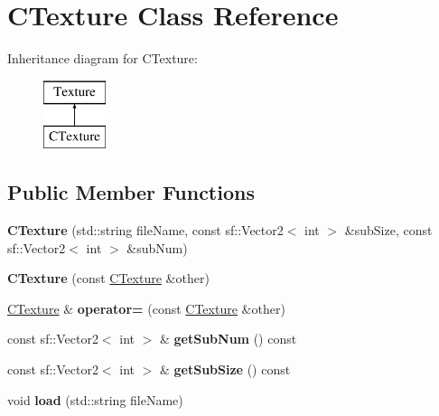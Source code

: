 \hypertarget{classCTexture}{\section{C\-Texture Class Reference}
\label{classCTexture}
}
Inheritance diagram for C\-Texture\-:\begin{figure}[H]
\begin{center}
\leavevmode
\includegraphics[height=2.000000cm]{classCTexture}
\end{center}
\end{figure}
\subsection*{Public Member Functions}
\begin{DoxyCompactItemize}
\item 
\hypertarget{classCTexture_a03a03314b328783682d200443b561890}{{\bfseries C\-Texture} (std\-::string file\-Name, const sf\-::\-Vector2$<$ int $>$ \&sub\-Size, const sf\-::\-Vector2$<$ int $>$ \&sub\-Num)}\label{classCTexture_a03a03314b328783682d200443b561890}

\item 
\hypertarget{classCTexture_a2bb6709e0d63ccb6fb3219eb5528570f}{{\bfseries C\-Texture} (const \hyperlink{classCTexture}{C\-Texture} \&other)}\label{classCTexture_a2bb6709e0d63ccb6fb3219eb5528570f}

\item 
\hypertarget{classCTexture_ab4f29f7f73e347dfac33672e3b9a64c8}{\hyperlink{classCTexture}{C\-Texture} \& {\bfseries operator=} (const \hyperlink{classCTexture}{C\-Texture} \&other)}\label{classCTexture_ab4f29f7f73e347dfac33672e3b9a64c8}

\item 
\hypertarget{classCTexture_a52a074211eaa812a91200f73f8387aca}{const sf\-::\-Vector2$<$ int $>$ \& {\bfseries get\-Sub\-Num} () const }\label{classCTexture_a52a074211eaa812a91200f73f8387aca}

\item 
\hypertarget{classCTexture_a100f28379f113485d1e7574705ba977f}{const sf\-::\-Vector2$<$ int $>$ \& {\bfseries get\-Sub\-Size} () const }\label{classCTexture_a100f28379f113485d1e7574705ba977f}

\item 
\hypertarget{classCTexture_a0756fcbdac0b2e53cbaea1c35c64a939}{void {\bfseries load} (std\-::string file\-Name)}\label{classCTexture_a0756fcbdac0b2e53cbaea1c35c64a939}

\end{DoxyCompactItemize}


